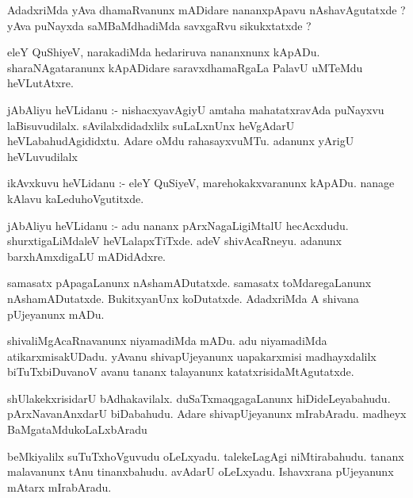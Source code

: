\documentclass{article}
\begin{document}
\begin{mn}
AdadxriMda  yAva  dhamaRvanunx  mADidare  nananxpApavu  nAshavAgutatxde ?  yAva  puNayxda  
saMBaMdhadiMda  savxgaRvu  sikukxtatxde ?
\end{mn}

\begin{mn}
eleY  QuShiyeV,  narakadiMda  hedariruva  nananxnunx  kApADu.  sharaNAgataranunx  kApADidare  
saravxdhamaRgaLa  PalavU  uMTeMdu  heVLutAtxre.
\end{mn}

\begin{mn}
jAbAliyu  heVLidanu :- nishacxyavAgiyU  amtaha  mahatatxravAda  puNayxvu  laBisuvudilalx.  
sAvilalxdidadxlilx  suLaLxnUnx  heVgAdarU  heVLabahudAgididxtu.  Adare  oMdu  rahasayxvuMTu.  
adanunx  yArigU  heVLuvudilalx
\end{mn}

\begin{mn}
ikAvxkuvu  heVLidanu :- eleY  QuSiyeV,  marehokakxvaranunx  kApADu.  nanage  kAlavu  kaLeduhoVgutitxde.
\end{mn}

\begin{mn}
jAbAliyu  heVLidanu :- adu  nananx  pArxNagaLigiMtalU   hecAcxdudu.  shurxtigaLiMdaleV  heVLalapxTiTxde.  
adeV  shivAcaRneyu.  adanunx  barxhAmxdigaLU  mADidAdxre.
\end{mn}

\begin{mn}
samasatx  pApagaLanunx  nAshamADutatxde.  samasatx  toMdaregaLanunx  nAshamADutatxde.  BukitxyanUnx  
koDutatxde.  AdadxriMda  A  shivana  pUjeyanunx  mADu.
\end{mn}

\begin{mn}
shivaliMgAcaRnavanunx  niyamadiMda  mADu.  adu  niyamadiMda  atikarxmisakUDadu.  yAvanu  shivapUjeyanunx  
uapakarxmisi  madhayxdalilx  biTuTxbiDuvanoV  avanu  tananx  talayanunx  katatxrisidaMtAgutatxde.
\end{mn}

\begin{mn}
shUlakekxrisidarU  bAdhakavilalx.  duSaTxmaqgagaLanunx  hiDideLeyabahudu.  pArxNavanAnxdarU  biDabahudu.  
Adare  shivapUjeyanunx  mIrabAradu.  madheyx  BaMgataMdukoLaLxbAradu
\end{mn}

\begin{mn}
beMkiyalilx  suTuTxhoVguvudu  oLeLxyadu.  talekeLagAgi  niMtirabahudu.  tananx  malavanunx  tAnu  tinanxbahudu.  
avAdarU  oLeLxyadu.  Ishavxrana  pUjeyanunx  mAtarx  mIrabAradu.
\end{mn}
\end{document}

